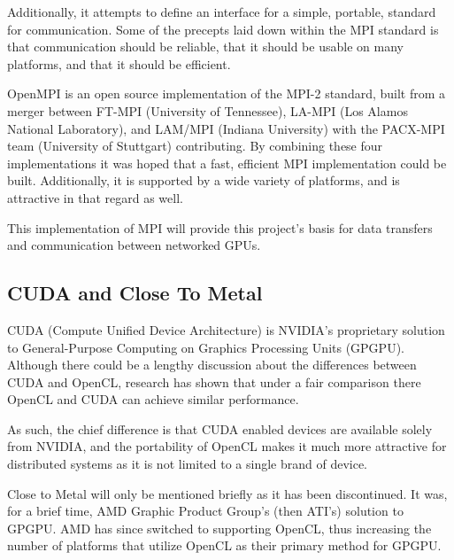 \documentclass[../thesis.tex]{subfiles}
\begin{document}
        Additionally, it attempts to define an interface for a simple, portable, standard for communication. Some of the precepts laid down within the MPI standard is that communication should be reliable, that it should be usable on many platforms, and that it should be efficient.


        OpenMPI is an open source implementation of the MPI-2 standard, built from a merger between FT-MPI (University of Tennessee), LA-MPI (Los Alamos National Laboratory), and LAM/MPI (Indiana University) with the PACX-MPI team (University of Stuttgart) contributing. By combining these four implementations it was hoped that a fast, efficient MPI implementation could be built.\cite{openmpiwebsite} Additionally, it is supported by a wide variety of platforms, and is attractive in that regard as well.

        This implementation of MPI will provide this project's basis for data transfers and communication between networked GPUs.
    
    \subsection{CUDA and Close To Metal} %
    \label{sub:cuda_and_close_to_metal}
        CUDA (Compute Unified Device Architecture) is NVIDIA's proprietary solution to General-Purpose Computing on Graphics Processing Units (GPGPU). Although there could be a lengthy discussion about the differences between CUDA and OpenCL, research has shown that under a fair comparison there OpenCL and CUDA can achieve similar performance\cite{6047190}.

        As such, the chief difference is that CUDA enabled devices are available solely from NVIDIA\cite{cudagpus}, and the portability of OpenCL makes it much more attractive for distributed systems as it is not limited to a single brand of device.

        Close to Metal will only be mentioned briefly as it has been discontinued. It was, for a brief time, AMD Graphic Product Group's (then ATI's) solution to GPGPU. AMD has since switched to supporting OpenCL, thus increasing the number of platforms that utilize OpenCL as their primary method for GPGPU.
\end{document}
